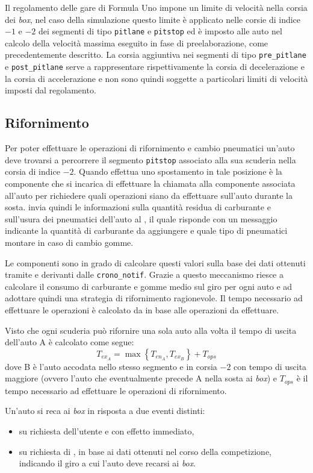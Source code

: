 Il regolamento delle gare di Formula Uno impone un limite di velocità nella corsia dei \textit{box}, nel caso della simulazione questo limite è applicato nelle corsie di indice $-1$ e $-2$ dei segmenti di tipo \texttt{pitlane} e \texttt{pitstop} ed è imposto alle auto nel calcolo della velocità massima eseguito in fase di preelaborazione, come precedentemente descritto.
La corsia aggiuntiva nei segmenti di tipo \texttt{pre\_pitlane} e \texttt{post\_pitlane} serve a rappresentare rispettivamente la corsia di decelerazione e la corsia di accelerazione e non sono quindi soggette a particolari limiti di velocità imposti dal regolamento.

\subsection{Rifornimento}
\label{sec:rifornimento}
Per poter effettuare le operazioni di rifornimento e cambio pneumatici un'auto deve trovarsi a percorrere il segmento \texttt{pitstop} associato alla sua scuderia nella corsia di indice $-2$. Quando \car{} effettua uno spostamento in tale posizione è la componente \track{} che si incarica di effettuare la chiamata alla componente \team{} associata all'auto per richiedere quali operazioni siano da effettuare sull'auto durante la sosta. \track{} invia quindi le informazioni sulla quantità residua di carburante e sull'usura dei pneumatici dell'auto al \team{}, il quale risponde con un messaggio indicante la quantità di carburante da aggiungere e quale tipo di pneumatici montare in caso di cambio gomme.

Le componenti \team{} sono in grado di calcolare questi valori sulla base dei dati ottenuti tramite \evdisp{} e derivanti dalle \texttt{crono\_notif}. Grazie a questo meccanismo \team{} riesce a calcolare il consumo di carburante e gomme medio sul giro per ogni auto e ad adottare quindi una strategia di rifornimento ragionevole.
Il tempo necessario ad effettuare le operazioni è calcolato da \track{} in base alle operazioni da effettuare.

Visto che ogni scuderia può rifornire una sola auto alla volta il tempo di uscita dell'auto A è calcolato come segue:
\[ T_{ex_A} = \max \left\{ T_{en_A}, T_{ex_B} \right\} + T_{ops} \]
dove B è l'auto accodata nello stesso segmento e in corsia $-2$ con tempo di uscita maggiore (ovvero l'auto che eventualmente precede A nella sosta ai \textit{box}) e $T_{ops}$ è il tempo necessario ad effettuare le operazioni di rifornimento.

Un'auto si reca ai \textit{box} in risposta a due eventi distinti:
\begin{itemize}
\item su richiesta dell'utente e con effetto immediato,
\item su richiesta di \team{}, in base ai dati ottenuti nel corso della competizione, indicando il giro a cui l'auto deve recarsi ai \textit{box}.
\end{itemize}

